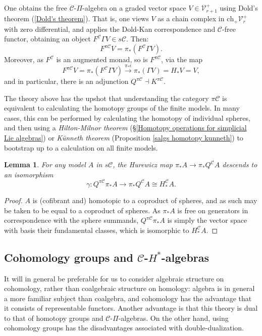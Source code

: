 \documentclass[11pt]{amsart} \renewcommand{\baselinestretch}{1.2}
\theoremstyle{plain}
\newtheorem{lem}[thm]{Lemma}
\theoremstyle{definition}
\renewcommand{\to}{\longrightarrow}
\newcommand{\calC}{\mathcal{C}}
\newcommand{\calV}{\mathcal{V}}
\newcommand{\calc}{\mathcal{C}}
\newcommand{\vect}[2]{\calV^{#1}_{#2}}
\newcommand{\PA}[1]{\pi#1}
\newcommand{\complexes}{\mathrm{ch}_+}
\begin{document}
\begin{Pi-algebras and cohomology algebras}
One obtains the free $\calc$-$\Pi$-algebra on a graded vector space $V\in \vect{+}{r+1}$ using Dold's theorem (\ref{Dold's theorem}). That is, one views $V$ as a chain complex in $\complexes\vect{+}{r}$ with zero differential, and applies the Dold-Kan correspondence and $\calc$-free functor, obtaining an object $F^\calc\Gamma V\in s\calc$. Then:
\[F^{\PA{\calc}}V=\pi_*(F^\calc\Gamma V).\]
Moreover, as $F^\calc $ is an augmented monad, so is $F^{\PA{\calc}}$, via the map
\[F^{\PA{\calc}}V=\pi_*(F^\calc\Gamma V)\overset{\pi_*\epsilon}{\to}\pi_*(\Gamma V)=H_*V=V,\]
and in particular, there is an adjunction $Q^{\PA{\calc}}\dashv K^{\PA{\calc}}$.

The theory above has the upshot that understanding the category $\PA{\calc}$ is equivalent to calculating the homotopy groups of the finite models. In many cases, this can be performed by calculating the homotopy of individual spheres, and then using a \emph{Hilton-Milnor theorem} (\S\ref{Homotopy operations for simplicial Lie algebras}) or \emph{K\"unneth theorem} (Proposition \ref{salgs homotopy kunneth}) to bootstrap up to a calculation on all finite models.



\begin{lem}
\label{Q of a model}
For any model $A$ in $s\calc$, the Hurewicz map $\pi_*A\to \pi_*Q^\calc A$ descends to an isomorphism
\[\gamma:Q^{\PA{\calc}}\pi_* A\to \pi_* Q^{\calc}A\cong H_*^{\calc}A.\]
\end{lem}
\begin{proof} $A$ is (cofibrant and) homotopic to a coproduct of spheres, and as such may be taken to be equal to a coproduct of spheres. As $\pi_* A$ is free on generators in correspondence with the sphere summands, $Q^{\PA{\calc}}\pi_* A$ is simply the vector space with basis their fundamental classes, which is isomorphic to $H_*^{\calc}A$.
\end{proof}
\subsection{Cohomology groups and $\calc$-$H^*$-algebras}\label{cohomology and Halgs}
It will in general be preferable for us to consider algebraic structure on cohomology, rather than coalgebraic structure on homology: algebra is in general a more familiar subject than coalgebra, and cohomology has the advantage that it consists of representable functors. 
Another advantage is that this theory is dual to that of homotopy groups and $\calC$-$\Pi$-algebras. On the other hand, using cohomology groups has the disadvantages associated with double-dualization.


\end{Pi-algebras and cohomology algebras}
\end{document}
